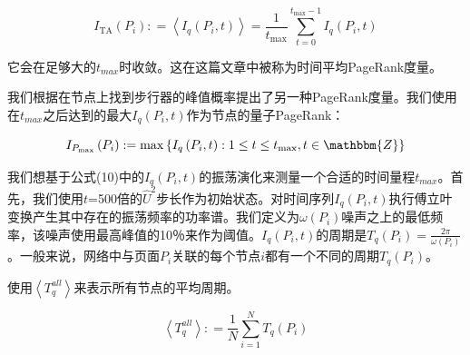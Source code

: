 \begin{equation}
	I _ { \mathrm { TA } } \left( P _ { i } \right) : = \left\langle I _ { q } \left( P _ { i } , t \right) \right\rangle = \frac { 1 } { t _ { \mathrm { max } } } \sum _ { t = 0 } ^ { t _ { \max } - 1 } I _ { q } \left( P _ { i } , t \right)
\end{equation}

它会在足够大的$t_{max}$时收敛。这在这篇文章中被称为时间平均PageRank度量。

我们根据在节点上找到步行器的峰值概率提出了另一种PageRank度量。我们使用在$t_{max}$之后达到的最大$I_q(P_i,t)$作为节点的量子PageRank：

\begin{equation}
	I _ { P _ { \max } } \left( P _ { i } \right) : = \max \left\{ I _ { q } \left( P _ { i } , t \right) : 1 \leq t \leq t _ { \max } , t \in \mathbbm { Z } \right\}
\end{equation}

我们想基于公式(10)中的$I_q(P_i,t)$的振荡演化来测量一个合适的时间量程$t_{max}$。首先，我们使用$t$=500倍的$\hat{U}^2$步长作为初始状态。对时间序列$I_q(P_i,t)$执行傅立叶变换产生其中存在的振荡频率的功率谱。我们定义为$\omega \left( P _ { i } \right)$噪声之上的最低频率，该噪声使用最高峰值的10％来作为阈值。$I_q(P_i,t)$的周期是$T _ { q } \left( P _ { i } \right) = \frac { 2 \pi } { \omega \left( P _ { i } \right) }$。一般来说，网络中与页面$P_i$关联的每个节点$i$都有一个不同的周期$T_q(P_i)$。

使用$\left\langle T _ { q } ^ { a l l } \right\rangle$来表示所有节点的平均周期。

\begin{equation}
	\left\langle T _ { q } ^ { a l l } \right\rangle : = \frac { 1 } { N } \sum _ { i = 1 } ^ { N } T _ { q } \left( P _ { i } \right)
\end{equation}

